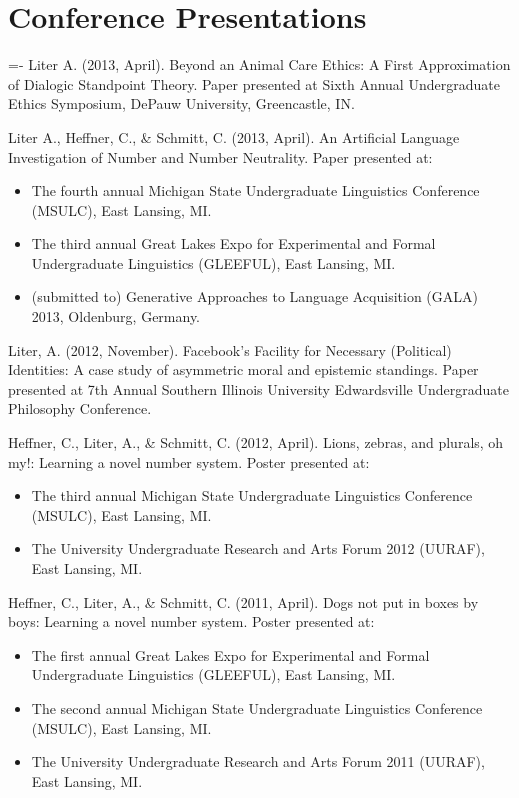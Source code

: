 \documentclass[11pt,a4paper,sans]{moderncv}   %
\begin{document}
\section{Conference Presentations}
\newenvironment{fakebib}
{\par\leftskip=0.25in \parindent=-\leftskip}
{\par}
\begin{fakebib}
Liter A. (2013, April). Beyond an Animal Care Ethics: A First Approximation of Dialogic Standpoint Theory. Paper presented at Sixth Annual Undergraduate Ethics Symposium, DePauw University, Greencastle, IN.

Liter A., Heffner, C., \& Schmitt, C. (2013, April). An Artificial Language Investigation of Number and Number Neutrality. Paper presented at:
\begin{itemize}[leftmargin=.25in]
\item The fourth annual Michigan State Undergraduate Linguistics Conference (MSULC), East Lansing, MI.
\item The third annual Great Lakes Expo for Experimental and Formal Undergraduate Linguistics (GLEEFUL), East Lansing, MI.
\item (submitted to) Generative Approaches to Language Acquisition (GALA) 2013, Oldenburg, Germany.
\end{itemize}

Liter, A. (2012, November). Facebook's Facility for Necessary (Political) Identities: A case study of asymmetric moral and epistemic standings. Paper presented at  7th Annual Southern Illinois University Edwardsville Undergraduate Philosophy Conference. 

Heffner, C., Liter, A., \& Schmitt, C. (2012, April). Lions, zebras, and plurals, oh my!: Learning a novel number system. Poster presented at:
\begin{itemize}[leftmargin=.25in]
\item The third annual Michigan State Undergraduate Linguistics Conference (MSULC), East Lansing, MI.
\item The University Undergraduate Research and Arts Forum 2012 (UURAF), East Lansing, MI.
\end{itemize}

Heffner, C., Liter, A., \& Schmitt, C. (2011, April). Dogs not put in boxes by boys: Learning a novel number system. Poster presented at:
\begin{itemize}[leftmargin=.25in]
\item The first annual Great Lakes Expo for Experimental and Formal Undergraduate Linguistics (GLEEFUL), East
Lansing, MI.
\item The second annual Michigan State Undergraduate Linguistics Conference (MSULC), East Lansing, MI.
\item The University Undergraduate Research and Arts Forum 2011 (UURAF), East Lansing, MI.
\end{itemize}


\end{fakebib}
\end{document}
